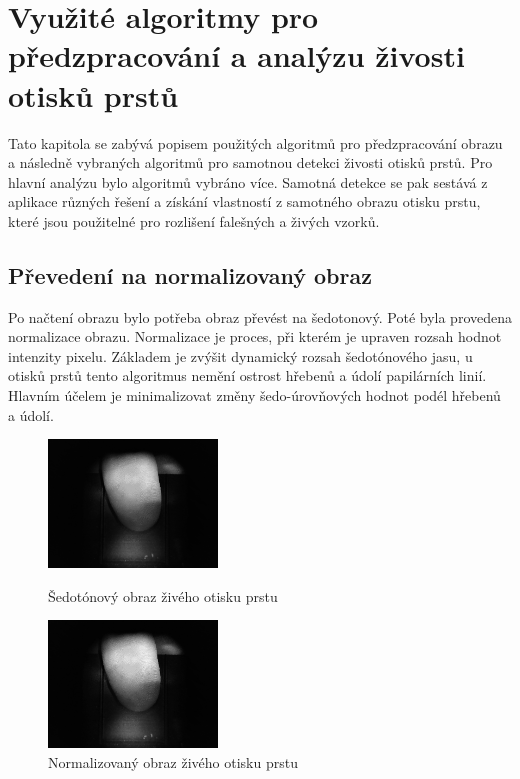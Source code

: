 \chapter{Využité algoritmy pro předzpracování a analýzu živosti otisků prstů}
Tato kapitola se zabývá popisem použitých algoritmů pro předzpracování obrazu a následně vybraných algoritmů pro samotnou detekci živosti otisků prstů. Pro hlavní analýzu bylo algoritmů vybráno více. Samotná detekce se pak sestává z aplikace různých řešení a získání vlastností z samotného obrazu otisku prstu, které jsou použitelné pro rozlišení falešných a živých vzorků.
\section{Převedení na normalizovaný obraz}
Po načtení obrazu bylo potřeba obraz převést na šedotonový. Poté byla provedena normalizace obrazu. Normalizace je proces, při kterém je upraven rozsah hodnot intenzity pixelu. Základem je zvýšit dynamický rozsah šedotónového jasu, u otisků prstů tento algoritmus nemění ostrost hřebenů a údolí papilárních linií. Hlavním účelem je minimalizovat změny šedo-úrovňových hodnot podél hřebenů a údolí. 

\begin{figure}[htbp]
  \begin{minipage}[b]{0.5\linewidth}
    \centering
    \includegraphics[width=170px]{obrazky-figures/live87grayscale.png}
    \caption{Šedotónový obraz živého otisku prstu}
  \end{minipage}
  \hspace{0.5cm}
  \begin{minipage}[b]{0.5\linewidth}
    \centering
    \includegraphics[width=170px]{obrazky-figures/live87norm.png}
    \caption{Normalizovaný obraz živého otisku prstu}
  \end{minipage}
\end{figure}



